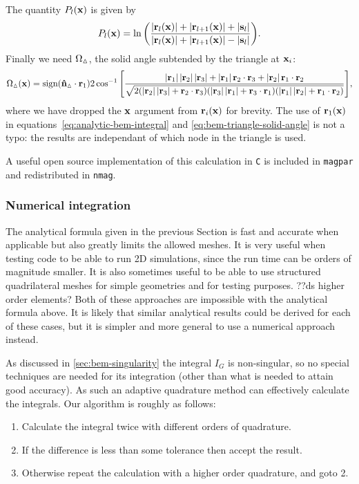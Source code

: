 The quantity $P_l(\mathbf{x})$ is given by
\begin{equation}
  P_l(\mathbf{x}) = \ln{\left( \frac{\left|{\mathbf{r}_l(\mathbf{x})} \right| + \left|{\mathbf{r}_{l+1}(\mathbf{x})} \right| + \left|{{\mathbf{s}}_l} \right|}
    {\left|{\mathbf{r}_l(\mathbf{x})} \right| + \left|{\mathbf{r}_{l+1}(\mathbf{x})} \right| - \left|{{\mathbf{s}}_l} \right|} \right)}.
\end{equation}
Finally we need $\Omega_\vartriangle$, the solid angle subtended by the triangle at $\mathbf{x}_i$:
\begin{equation}
  \label{eq:bem-triangle-solid-angle}
  \Omega_\vartriangle(\mathbf{x}) = \text{sign}(\mathbf{\hat{n}}_\vartriangle \cdot \mathbf{r}_1) 2 \cos^{-1}{\left[ \frac
    {\left|{\mathbf{r}_1} \right|\left|{\mathbf{r}_2} \right|\left|{\mathbf{r}_3} \right| + \left|{\mathbf{r}_1} \right| \mathbf{r}_2\cdot\mathbf{r}_3 + \left|{\mathbf{r}_2} \right|\mathbf{r}_1\cdot \mathbf{r}_2}
    {\sqrt{2(\left|{\mathbf{r}_2} \right|\left|{\mathbf{r}_3} \right| + \mathbf{r}_2\cdot\mathbf{r}_3)
        (\left|{\mathbf{r}_3} \right|\left|{\mathbf{r}_1} \right| + \mathbf{r}_3\cdot\mathbf{r}_1)
        (\left|{\mathbf{r}_1} \right|\left|{\mathbf{r}_2} \right| + \mathbf{r}_1\cdot\mathbf{r}_2)}} \right]},
\end{equation}
where we have dropped the $\mathbf{x}$ argument from $\mathbf{r}_i(\mathbf{x})$ for brevity.
The use of $\mathbf{r}_1(\mathbf{x})$ in equations~\cref{eq:analytic-bem-integral} and \cref{eq:bem-triangle-solid-angle} is not a typo: the results are independant of which node in the triangle is used.


A useful open source implementation of this calculation in \texttt{C} is included in \texttt{magpar}\cite{magpar-website} and redistributed in \texttt{nmag}\cite{nmag-website}.


\subsubsection{Numerical integration}

The analytical formula given in the previous Section is fast and accurate when applicable but also greatly limits the allowed meshes.
It is very useful when testing code to be able to run 2D simulations, since the run time can be orders of magnitude smaller.
It is also sometimes useful to be able to use structured quadrilateral meshes for simple geometries and for testing purposes.
??ds higher order elements?
Both of these approaches are impossible with the analytical formula above.
It is likely that similar analytical results could be derived for each of these cases, but it is simpler and more general to use a numerical approach instead.

As discussed in \cref{sec:bem-singularity} the integral $I_G$ is non-singular, so no special techniques are needed for its integration (other than what is needed to attain good accuracy).
As such an adaptive quadrature method can effectively calculate the integrals.
Our algorithm is roughly as follows:
\begin{enumerate}
\item Calculate the integral twice with different orders of quadrature.
\item If the difference is less than some tolerance then accept the result.
\item Otherwise repeat the calculation with a higher order quadrature, and goto 2.
\end{enumerate}

